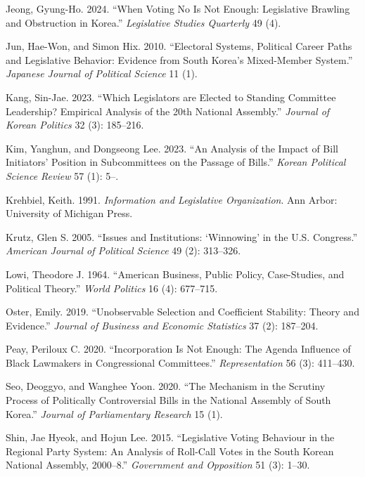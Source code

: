 \documentclass[11pt]{article}
\begin{document}
\begin{description}
\item Jeong, Gyung-Ho. 2024. ``When Voting No Is Not Enough: Legislative Brawling and Obstruction in Korea.'' \textit{Legislative Studies Quarterly} 49 (4).

\item Jun, Hae-Won, and Simon Hix. 2010. ``Electoral Systems, Political Career Paths and Legislative Behavior: Evidence from South Korea's Mixed-Member System.'' \textit{Japanese Journal of Political Science} 11 (1).

\item Kang, Sin-Jae. 2023. ``Which Legislators are Elected to Standing Committee Leadership? Empirical Analysis of the 20th National Assembly.'' \textit{Journal of Korean Politics} 32 (3): 185--216.

\item Kim, Yanghun, and Dongseong Lee. 2023. ``An Analysis of the Impact of Bill Initiators' Position in Subcommittees on the Passage of Bills.'' \textit{Korean Political Science Review} 57 (1): 5--.

\item Krehbiel, Keith. 1991. \textit{Information and Legislative Organization}. Ann Arbor: University of Michigan Press.

\item Krutz, Glen S. 2005. ``Issues and Institutions: `Winnowing' in the U.S. Congress.'' \textit{American Journal of Political Science} 49 (2): 313--326.

\item Lowi, Theodore J. 1964. ``American Business, Public Policy, Case-Studies, and Political Theory.'' \textit{World Politics} 16 (4): 677--715.

\item Oster, Emily. 2019. ``Unobservable Selection and Coefficient Stability: Theory and Evidence.'' \textit{Journal of Business and Economic Statistics} 37 (2): 187--204.

\item Peay, Periloux C. 2020. ``Incorporation Is Not Enough: The Agenda Influence of Black Lawmakers in Congressional Committees.'' \textit{Representation} 56 (3): 411--430.

\item Seo, Deoggyo, and Wanghee Yoon. 2020. ``The Mechanism in the Scrutiny Process of Politically Controversial Bills in the National Assembly of South Korea.'' \textit{Journal of Parliamentary Research} 15 (1).

\item Shin, Jae Hyeok, and Hojun Lee. 2015. ``Legislative Voting Behaviour in the Regional Party System: An Analysis of Roll-Call Votes in the South Korean National Assembly, 2000--8.'' \textit{Government and Opposition} 51 (3): 1--30.


\end{description}
\end{document}
